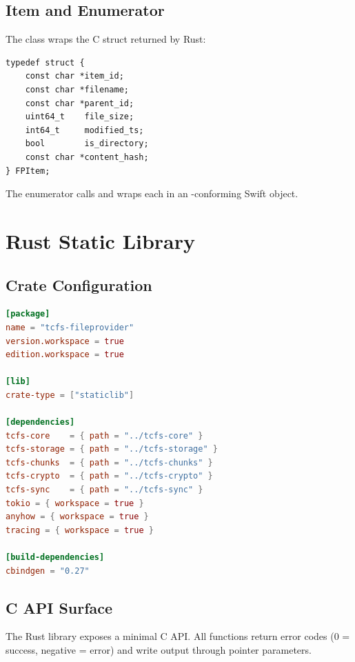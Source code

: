 \documentclass[11pt,a4paper]{article}
\begin{document}
\subsection{Item and Enumerator}

The  class wraps the C struct returned by Rust:

\begin{lstlisting}[language={},title={C bridge types (cbindgen output)}]
typedef struct {
    const char *item_id;
    const char *filename;
    const char *parent_id;
    uint64_t    file_size;
    int64_t     modified_ts;
    bool        is_directory;
    const char *content_hash;
} FPItem;
\end{lstlisting}

The enumerator calls  and wraps each
 in an -conforming Swift object.

\section{Rust Static Library}

\subsection{Crate Configuration}

\begin{lstlisting}[language=toml,title={crates/tcfs-fileprovider/Cargo.toml (future)}]
[package]
name = "tcfs-fileprovider"
version.workspace = true
edition.workspace = true

[lib]
crate-type = ["staticlib"]

[dependencies]
tcfs-core    = { path = "../tcfs-core" }
tcfs-storage = { path = "../tcfs-storage" }
tcfs-chunks  = { path = "../tcfs-chunks" }
tcfs-crypto  = { path = "../tcfs-crypto" }
tcfs-sync    = { path = "../tcfs-sync" }
tokio = { workspace = true }
anyhow = { workspace = true }
tracing = { workspace = true }

[build-dependencies]
cbindgen = "0.27"
\end{lstlisting}

\subsection{C API Surface}

The Rust library exposes a minimal C API. All functions return 
error codes (0 = success, negative = error) and write output through
pointer parameters.
\end{document}
